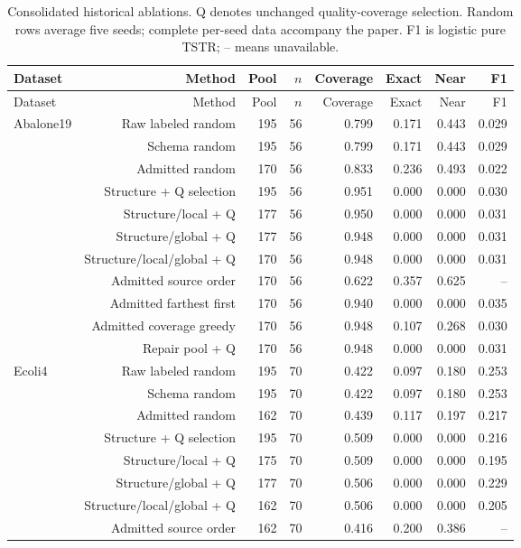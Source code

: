 \begin{longtable}{lrrrrrrr}
\caption{Consolidated historical ablations. Q denotes unchanged quality-coverage selection. Random rows average five seeds; complete per-seed data accompany the paper. F1 is logistic pure TSTR; -- means unavailable.}\label{tab:ablations}\\
\toprule
Dataset & Method & Pool & $n$ & Coverage & Exact & Near & F1 \\
\midrule\endfirsthead
\toprule
Dataset & Method & Pool & $n$ & Coverage & Exact & Near & F1 \\
\midrule\endhead
Abalone19 & Raw labeled random & 195 & 56 & 0.799 & 0.171 & 0.443 & 0.029 \\
 & Schema random & 195 & 56 & 0.799 & 0.171 & 0.443 & 0.029 \\
 & Admitted random & 170 & 56 & 0.833 & 0.236 & 0.493 & 0.022 \\
 & Structure + Q selection & 195 & 56 & 0.951 & 0.000 & 0.000 & 0.030 \\
 & Structure/local + Q & 177 & 56 & 0.950 & 0.000 & 0.000 & 0.031 \\
 & Structure/global + Q & 177 & 56 & 0.948 & 0.000 & 0.000 & 0.031 \\
 & Structure/local/global + Q & 170 & 56 & 0.948 & 0.000 & 0.000 & 0.031 \\
 & Admitted source order & 170 & 56 & 0.622 & 0.357 & 0.625 & -- \\
 & Admitted farthest first & 170 & 56 & 0.940 & 0.000 & 0.000 & 0.035 \\
 & Admitted coverage greedy & 170 & 56 & 0.948 & 0.107 & 0.268 & 0.030 \\
 & Repair pool + Q & 170 & 56 & 0.948 & 0.000 & 0.000 & 0.031 \\
Ecoli4 & Raw labeled random & 195 & 70 & 0.422 & 0.097 & 0.180 & 0.253 \\
 & Schema random & 195 & 70 & 0.422 & 0.097 & 0.180 & 0.253 \\
 & Admitted random & 162 & 70 & 0.439 & 0.117 & 0.197 & 0.217 \\
 & Structure + Q selection & 195 & 70 & 0.509 & 0.000 & 0.000 & 0.216 \\
 & Structure/local + Q & 175 & 70 & 0.509 & 0.000 & 0.000 & 0.195 \\
 & Structure/global + Q & 177 & 70 & 0.506 & 0.000 & 0.000 & 0.229 \\
 & Structure/local/global + Q & 162 & 70 & 0.506 & 0.000 & 0.000 & 0.205 \\
 & Admitted source order & 162 & 70 & 0.416 & 0.200 & 0.386 & -- \\

\end{longtable}
